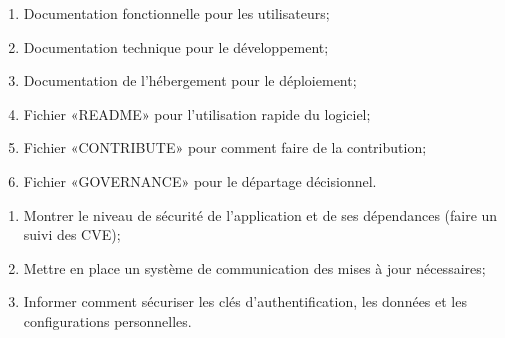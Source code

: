 \begin{enumerate}
    \item Documentation fonctionnelle pour les utilisateurs;
    \item Documentation technique pour le développement;
    \item Documentation de l'hébergement pour le déploiement;
    \item Fichier «README» pour l'utilisation rapide du logiciel;
    \item Fichier «CONTRIBUTE» pour comment faire de la contribution;
    \item Fichier «GOVERNANCE» pour le départage décisionnel.
\end{enumerate}

 \label{annexe_guide_securite}

\begin{enumerate}
    \item Montrer le niveau de sécurité de l'application et de ses dépendances (faire un suivi des CVE);
    \item Mettre en place un système de communication des mises à jour nécessaires;
    \item Informer comment sécuriser les clés d'authentification, les données et les configurations personnelles.
\end{enumerate}

 \label{annexe_guide_libre}

